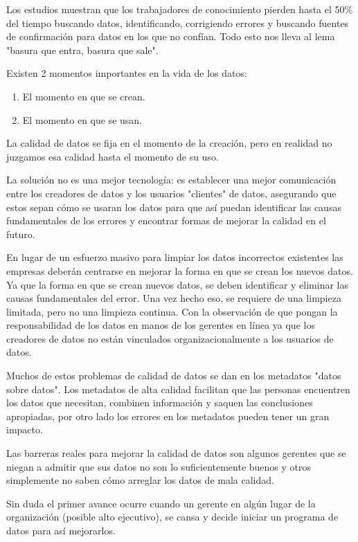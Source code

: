 \documentclass{article}
\begin{document}
Los estudios muestran que los trabajadores de conocimiento pierden hasta el 50\% del tiempo buscando datos, identificando, corrigiendo errores y buscando fuentes de confirmación para datos en los que no confían. Todo esto  nos lleva al lema "basura que entra, basura que sale". 

Existen 2 momentos importantes en la vida de los datos:
\begin{enumerate}
    \item El momento en que se crean.
    \item El momento en que se usan.
\end{enumerate}
	
La calidad de datos se fija en el momento de la creación, pero en realidad no juzgamos esa calidad hasta el momento de su uso. 

 La solución no es una mejor tecnología: es establecer una mejor comunicación entre los creadores de datos y los usuarios "clientes" de datos, asegurando que estos sepan cómo se usaran los datos para que así puedan identificar las causas fundamentales de los errores y encontrar formas de mejorar la calidad en el futuro. 

En lugar de un esfuerzo masivo para limpiar los datos incorrectos existentes las empresas deberán centrarse en mejorar la forma en que se crean los nuevos datos. Ya que la forma en que se crean nuevos datos, se deben identificar y eliminar las causas fundamentales del error. Una vez hecho eso, se requiere de una limpieza limitada, pero no una limpieza continua. Con la observación de que pongan la responsabilidad de los datos en manos de los gerentes en línea ya que los creadores de datos no están vinculados organizacionalmente a los usuarios de datos. 

Muchos de estos problemas de calidad de datos se dan en los metadatos "datos sobre datos". Los metadatos de alta calidad facilitan que las personas encuentren los datos que necesitan, combinen información y saquen las conclusiones apropiadas, por otro lado los errores en los metadatos pueden tener un gran impacto. 

Las barreras reales para mejorar la calidad de datos son algunos gerentes que se niegan a admitir que sus datos no son lo suficientemente buenos y otros simplemente no saben cómo arreglar los datos de mala calidad.

Sin duda el primer avance ocurre cuando un gerente en algún lugar de la organización  (posible alto ejecutivo), se cansa y decide iniciar un programa de datos para así mejorarlos.
\end{document}
